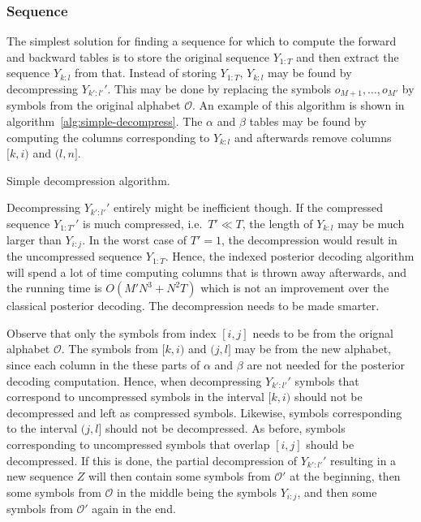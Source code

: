 \subsubsection{Sequence}

The simplest solution for finding a sequence for which to compute the forward
and backward tables is to store the original sequence $Y_{1:T}$ and then
extract the sequence $Y_{k:l}$ from that. Instead of storing $Y_{1:T}$,
$Y_{k:l}$ may be found by decompressing $Y_{k':l'}'$. This may be done by
replacing the symbols $o_{M + 1}, \dots, o_{M'}$ by symbols from the original
alphabet $\mathcal{O}$. An example of this algorithm is shown in
algorithm~\ref{alg:simple-decompress}. The $\alpha$ and $\beta$ tables may be
found by computing the columns corresponding to $Y_{k:l}$ and afterwards remove
columns $[k, i)$ and $(l, n]$.

\begin{algorithm}
  \caption{Simple decompression algorithm.}
  \label{alg:simple-decompress}
  \begin{algorithmic}[1]
        \EndFor{}
    \EndProcedure{}
  \end{algorithmic}
\end{algorithm}

Decompressing $Y_{k':l'}'$ entirely might be inefficient though. If the
compressed sequence $Y_{1:T'}'$ is much compressed, i.e.\ $T' \ll T$, the
length of $Y_{k:l}$ may be much larger than $Y_{i:j}$. In the worst case of
$T' = 1$, the decompression would result in the uncompressed sequence
$Y_{1:T}$. Hence, the indexed posterior decoding algorithm will spend a lot of
time computing columns that is thrown away afterwards, and the running time is
$O\left(M' N^3 + N^2 T\right)$ which is not an improvement over the classical
posterior decoding. The decompression needs to be made smarter.

Observe that only the symbols from index $[i,j]$ needs to be from the orignal
alphabet $\mathcal{O}$. The symbols from $[k, i)$ and $(j, l]$ may be from the
new alphabet, since each column in the these parts of $\alpha$ and $\beta$ are
not needed for the posterior decoding computation. Hence, when decompressing
$Y_{k':l'}'$ symbols that correspond to uncompressed symbols in the interval
$[k, i)$ should not be decompressed and left as compressed symbols. Likewise,
symbols corresponding to the interval $(j, l]$ should not be decompressed. As
before, symbols corresponding to uncompressed symbols that overlap $[i, j]$
should be decompressed. If this is done, the partial decompression of
$Y_{k':l'}'$ resulting in a new sequence $Z$ will then contain some symbols
from $\mathcal{O'}$ at the beginning, then some symbols from $\mathcal{O}$ in
the middle being the symbols $Y_{i:j}$, and then some symbols from
$\mathcal{O'}$ again in the end.

